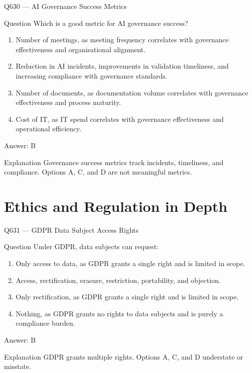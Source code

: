 \documentclass[aspectratio=169,8pt]{beamer}
\begin{document}
	\begin{frame}{Q630 --- AI Governance Success Metrics}
		\begin{block}{Question}
			Which is a good metric for AI governance success?
			\begin{enumerate}
				\item Number of meetings, as meeting frequency correlates with governance effectiveness and organisational alignment.
				\item Reduction in AI incidents, improvements in validation timeliness, and increasing compliance with governance standards.
				\item Number of documents, as documentation volume correlates with governance effectiveness and process maturity.
				\item Cost of IT, as IT spend correlates with governance effectiveness and operational efficiency.
			\end{enumerate}
		\end{block}
		\begin{exampleblock}{Answer: B}\end{exampleblock}
		\begin{block}{Explanation}
			Governance success metrics track incidents, timeliness, and compliance. Options A, C, and D are not meaningful metrics.
		\end{block}
	\end{frame}
	
	\section{Ethics and Regulation in Depth}
	
	\begin{frame}{Q631 --- GDPR Data Subject Access Rights}
		\begin{block}{Question}
			Under GDPR, data subjects can request:
			\begin{enumerate}
				\item Only access to data, as GDPR grants a single right and is limited in scope.
				\item Access, rectification, erasure, restriction, portability, and objection.
				\item Only rectification, as GDPR grants a single right and is limited in scope.
				\item Nothing, as GDPR grants no rights to data subjects and is purely a compliance burden.
			\end{enumerate}
		\end{block}
		\begin{exampleblock}{Answer: B}\end{exampleblock}
		\begin{block}{Explanation}
			GDPR grants multiple rights. Options A, C, and D understate or misstate.
		\end{block}
	\end{frame}
	
\end{document}
